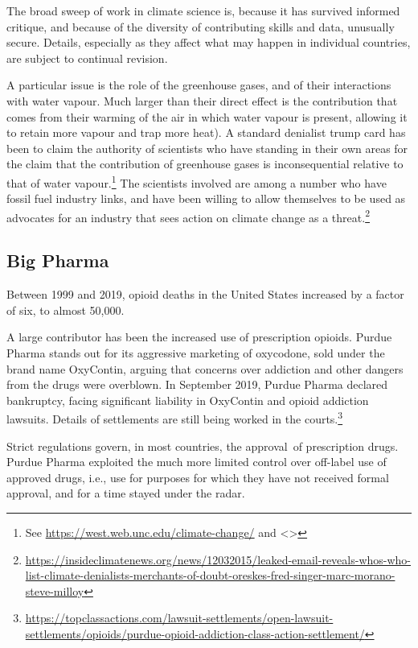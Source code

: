 \documentclass[
  10pt,
  b5paper]{book}
\begin{document}
The broad sweep of work in climate science is, because it has survived
informed critique, and because of the diversity of contributing skills
and data, unusually secure. Details, especially as they affect what may
happen in individual countries, are subject to continual revision.

A particular issue is the role of the greenhouse gases, and of their
interactions with water vapour. Much larger than their direct effect
is the contribution that comes from their warming of the air in which
water vapour is present, allowing it to retain more vapour and trap
more heat). A standard denialist trump card has been to claim the
authority of scientists who have standing in their own areas for the
claim that the contribution of greenhouse gases is inconsequential
relative to that of water
vapour.\footnote{See \url{https://west.web.unc.edu/climate-change/} and
  \textless\textgreater{}}
The scientists involved are among a number who have fossil fuel
industry links, and have been willing to allow themselves to be
used as advocates for an industry that sees action on climate
change as a threat.\footnote{\url{https://insideclimatenews.org/news/12032015/leaked-email-reveals-whos-who-list-climate-denialists-merchants-of-doubt-oreskes-fred-singer-marc-morano-steve-milloy}}

\hypertarget{big-pharma}{%
\subsection*{Big Pharma}\label{big-pharma}}

Between 1999 and 2019, opioid deaths in the United States increased
by a factor of six, to almost 50,000.

A large contributor has been the increased use of prescription
opioids. Purdue Pharma stands out for its aggressive marketing of
oxycodone, sold under the brand name OxyContin, arguing that
concerns over addiction and other dangers from the drugs were
overblown. In September 2019, Purdue Pharma declared bankruptcy,
facing significant liability in OxyContin and opioid addiction
lawsuits. Details of settlements are still being worked in the
courts.\footnote{ \url{https://topclassactions.com/lawsuit-settlements/open-lawsuit-settlements/opioids/purdue-opioid-addiction-class-action-settlement/}}

Strict regulations govern, in most countries, the approval~of
prescription drugs. Purdue Pharma exploited the much more
limited control over off-label use of approved drugs, i.e.,
use for purposes for which they have not received formal
approval, and for a time stayed under the radar.
\end{document}
